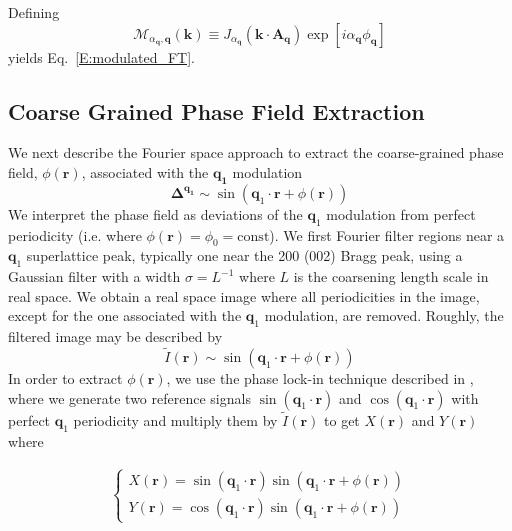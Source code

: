 \documentclass[12pt]{article}
\begin{document}
Defining
\begin{equation*}
    \mathcal{M}_{\alpha_{\mathbf{q}},\mathbf{q}}(\mathbf{k}) \equiv J_{\alpha_{\mathbf{q}}}\left(\mathbf{k}\cdot\mathbf{A}_{\mathbf{q}}\right) \exp\left[i\alpha_{\mathbf{q}}\phi_{\mathbf{q}}\right] 
\end{equation*}
yields Eq.~\ref{E:modulated_FT}.


\subsection*{Coarse Grained Phase Field Extraction}

We next describe the Fourier space approach to extract the coarse-grained phase field, $\phi(\mathbf{r})$, associated with the $\mathbf{q_{1}}$ modulation
\begin{equation*}
\mathbf{\Delta^{\mathbf{q}_1}} \sim \sin(\mathbf{q}_{1}\cdot\mathbf{r}+\phi(\mathbf{r}))
\end{equation*}
We interpret the phase field as deviations of the $\mathbf{q}_1$ modulation from perfect periodicity (i.e. where $\phi(\mathbf{r}) = \phi_{0} = \text{const}$). 
We first Fourier filter regions near a $\mathbf{q}_1$ superlattice peak, typically one near the 200 (002) Bragg peak, using a Gaussian filter with a width $\sigma = L^{-1}$ where $L$ is the coarsening length scale in real space.
We obtain a real space image where all periodicities in the image, except for the one associated with the $\mathbf{q}_1$ modulation, are removed.
Roughly, the filtered image may be described by 
\begin{equation*}
\tilde{I}(\mathbf{r}) \sim \sin(\mathbf{q}_1\cdot\mathbf{r}+\phi(\mathbf{r}))
\end{equation*}
In order to extract $\phi(\mathbf{r})$, we use the phase lock-in technique described in \cite{Lawler2010}, where we generate two reference signals $\sin(\mathbf{q}_1\cdot\mathbf{r})$ and $\cos(\mathbf{q}_1\cdot\mathbf{r})$ with perfect $\mathbf{q}_1$ periodicity and multiply them by $\tilde{I}(\mathbf{r})$ to get $X(\mathbf{r})$ and $Y(\mathbf{r})$ where

\begin{equation*}
\begin{aligned}
\begin{cases}
X(\mathbf{r}) = \sin(\mathbf{q}_1\cdot\mathbf{r}) \sin(\mathbf{q}_1\cdot\mathbf{r}+\phi(\mathbf{r})) \\
Y(\mathbf{r}) = \cos(\mathbf{q}_1\cdot\mathbf{r}) \sin(\mathbf{q}_1\cdot\mathbf{r}+\phi(\mathbf{r}))
\end{cases}
\end{aligned}
\end{equation*}
\end{document}
